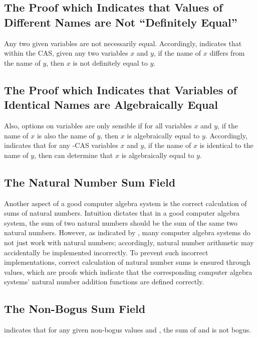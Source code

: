 \documentclass{report}
\begin{document}
\subsection{The Proof which Indicates that Values of Different Names are Not ``Definitely Equal''}
Any two given variables are not necessarily equal.  Accordingly,   indicates that within the  CAS, given any two  variables \(x\) and \(y\), if the name of \(x\) differs from the name of \(y\), then \(x\) is not definitely equal to \(y\).

\subsection{The Proof which Indicates that Variables of Identical Names are Algebraically Equal}
Also, options on variables are only sensible if for all variables \(x\) and \(y\), if the name of \(x\) is also the name of \(y\), then \(x\) is algebraically equal to \(y\).  Accordingly,   indicates that for any -CAS variables \(x\) and \(y\), if the name of \(x\) is identical to the name of \(y\), then  can determine that \(x\) is algebraically equal to \(y\).

\subsection{The Natural Number Sum Field}
Another aspect of a good computer algebra system is the correct calculation of sums of natural numbers.  Intuition dictates that in a good computer algebra system, the sum of two natural numbers should be the sum of the same two natural numbers.  However, as indicated by , many computer algebra systems do not just work with natural numbers; accordingly, natural number arithmetic may accidentally be implemented incorrectly.  To prevent such incorrect implementations, correct calculation of natural number sums is ensured through  values, which are proofs which indicate that the corresponding computer algebra systems' natural number addition functions are defined correctly.

\subsection{The Non-Bogus Sum Field}
 indicates that for any given non-bogus values  and , the sum of  and  is not bogus.
\end{document}
